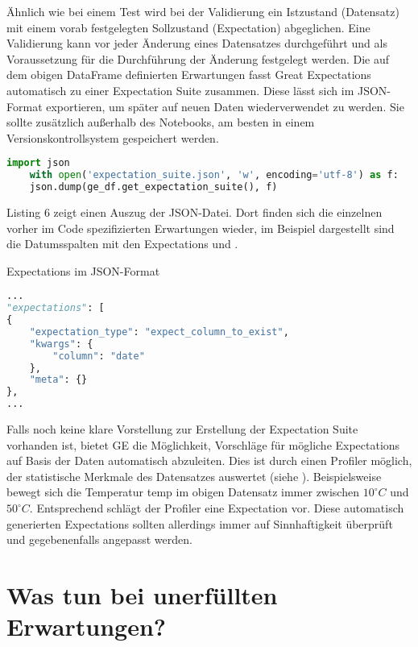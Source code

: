	Ähnlich wie bei einem Test wird bei der Validierung ein Istzustand (Datensatz) mit einem vorab festgelegten Sollzustand (Expectation) abgeglichen. Eine Validierung kann vor jeder Änderung eines Datensatzes durchgeführt und als Voraussetzung für die Durchführung der Änderung festgelegt werden. Die auf dem obigen DataFrame  definierten Erwartungen fasst Great Expectations automatisch zu einer Expectation Suite zusammen. Diese lässt sich im JSON-Format exportieren, um später auf neuen Daten wiederverwendet zu werden. Sie sollte zusätzlich außerhalb des Notebooks, am besten in einem Versionskontrollsystem gespeichert werden.
	
\begin{lstlisting}[language=Python]
	import json
	with open('expectation_suite.json', 'w', encoding='utf-8') as f:
	json.dump(ge_df.get_expectation_suite(), f)
\end{lstlisting}

	
	Listing 6 zeigt einen Auszug der JSON-Datei. Dort finden sich die einzelnen vorher im Code spezifizierten Erwartungen wieder, im Beispiel dargestellt sind die Datumsspalten mit den Expectations  und .
	
\begin{code}	
	\caption{Expectations im JSON-Format}
	
\begin{lstlisting}[language=Python]
...
"expectations": [
{
	"expectation_type": "expect_column_to_exist",
	"kwargs": {
		"column": "date"
	},
	"meta": {}
},
...    
\end{lstlisting}
\end{code}	
	
Falls noch keine klare Vorstellung zur Erstellung der Expectation Suite vorhanden ist, bietet GE die Möglichkeit, Vorschläge für mögliche Expectations auf Basis der Daten automatisch abzuleiten. Dies ist durch einen Profiler möglich, der statistische Merkmale des Datensatzes auswertet (siehe ). Beispielsweise bewegt sich die Temperatur temp im obigen Datensatz immer zwischen $10^\circ C$ und $50^\circ C$. Entsprechend schlägt der Profiler eine Expectation  vor. Diese automatisch generierten Expectations sollten allerdings immer auf Sinnhaftigkeit überprüft und gegebenenfalls angepasst werden.



\section{Was tun bei unerfüllten Erwartungen?}
	

